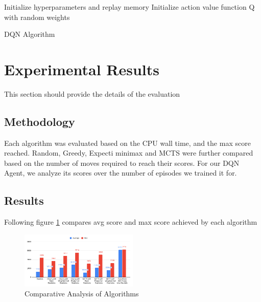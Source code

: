 \documentclass{svproc}
\begin{document}
\begin{algorithm}[H]
\SetAlgoLined
 Initialize hyperparameters and replay memory
 Initialize action value function Q with random weights	
 \caption{DQN Algorithm}
\end{algorithm}

    \section{Experimental Results}
    This section should provide the details of the evaluation

    \subsection{Methodology}
    Each algorithm was evaluated based on the CPU wall time, and the max score reached. Random, Greedy, Expecti minimax and MCTS were further compared based on the number of moves required to reach their scores. For our DQN Agent, we analyze its scores over the number of episodes we trained it for.
    \subsection{Results}

    Following figure \ref{comparative_analysis_of_algorithms} compares avg score and max score achieved by each algorithm

    \begin{figure}[h!]

        \centering
        \includegraphics[width=0.5\textwidth]{Comparative Analysis.png}
        \caption{Comparative Analysis of Algorithms}
        \label{comparative_analysis_of_algorithms}
    \end{figure}
\end{document}
